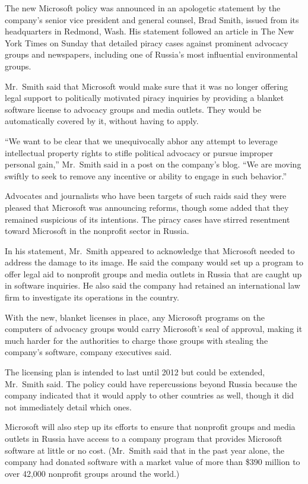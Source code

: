 ﻿\documentclass[12pt]{article}
\begin{document}
The new Microsoft policy was announced in an apologetic statement by the company's senior vice
president and general counsel, Brad Smith, issued from its headquarters in Redmond, Wash. His
statement followed an article in The New York Times on Sunday that detailed piracy cases against
prominent advocacy groups and newspapers, including one of Russia's most influential environmental
groups.

Mr.~Smith said that Microsoft would make sure that it was no longer offering legal support to
politically motivated piracy inquiries by providing a blanket software license to advocacy groups
and media outlets. They would be automatically covered by it, without having to apply.

``We want to be clear that we unequivocally abhor any attempt to leverage intellectual property
rights to stifle political advocacy or pursue improper personal gain,'' Mr.~Smith said in a post on
the company's blog. ``We are moving swiftly to seek to remove any incentive or ability to engage in
such behavior.''

Advocates and journalists who have been targets of such raids said they were pleased that Microsoft
was announcing reforms, though some added that they remained suspicious of its intentions. The
piracy cases have stirred resentment toward Microsoft in the nonprofit sector in Russia.

In his statement, Mr.~Smith appeared to acknowledge that Microsoft needed to address the damage to
its image. He said the company would set up a program to offer legal aid to nonprofit groups and
media outlets in Russia that are caught up in software inquiries. He also said the company had
retained an international law firm to investigate its operations in the country.

With the new, blanket licenses in place, any Microsoft programs on the computers of advocacy groups
would carry Microsoft's seal of approval, making it much harder for the authorities to charge those
groups with stealing the company's software, company executives said.

The licensing plan is intended to last until 2012 but could be extended, Mr.~Smith said. The policy
could have repercussions beyond Russia because the company indicated that it would apply to other
countries as well, though it did not immediately detail which ones.

Microsoft will also step up its efforts to ensure that nonprofit groups and media outlets in Russia
have access to a company program that provides Microsoft software at little or no cost. (Mr.~Smith
said that in the past year alone, the company had donated software with a market value of more than
\$390 million to over 42,000 nonprofit groups around the world.)
\end{document}
